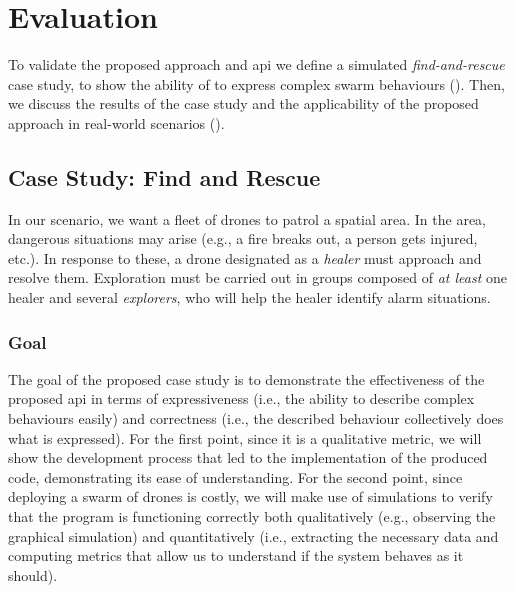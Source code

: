 \section{Evaluation}
\label{coordination2023-macro:sec:eval}

To validate the proposed approach and \ac{api} we define a simulated \emph{find-and-rescue} case study,
to show 
the ability of \MacroSwarm{} to express complex swarm behaviours (). 
Then, we discuss the results of the case study and the applicability of the proposed approach in real-world scenarios ().

\subsection{Case Study: Find and Rescue}\label{coordination2023-macro:subsec:case-study}
In our scenario, we want a fleet of drones to patrol a spatial area.
% 
In the area, dangerous situations may arise (e.g., a fire breaks out, a person gets injured, etc.). 
%
 In response to these, a drone designated as a \emph{healer} 
 must approach and resolve them. %
%
Exploration must be carried out in groups composed of \emph{at least} one 
 healer and several \emph{explorers}, who will help the healer identify alarm situations.

\subsubsection{Goal}
The goal of the proposed case study is to demonstrate the effectiveness of the proposed \ac{api} in terms of expressiveness (i.e., the ability to describe complex behaviours easily) and correctness (i.e., the described behaviour collectively does what is expressed). 
%
For the first point, since it is a qualitative metric, we will show the development process that led to the implementation of the produced code, demonstrating its ease of understanding. 
%
For the second point, since deploying a swarm of drones is costly, we will make use of simulations to verify that the program is functioning correctly both qualitatively (e.g., observing the graphical simulation) and quantitatively (i.e., extracting the necessary data and computing metrics that allow us to understand if the system behaves as it should).
%
%

